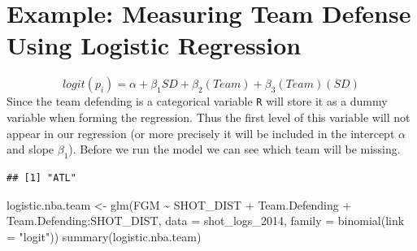\documentclass[
]{book}
\newenvironment{Shaded}{\begin{snugshade}}{\end{snugshade}}
\newcommand{\AttributeTok}[1]{\textcolor[rgb]{0.77,0.63,0.00}{#1}}
\newcommand{\DecValTok}[1]{\textcolor[rgb]{0.00,0.00,0.81}{#1}}
\newcommand{\FunctionTok}[1]{\textcolor[rgb]{0.00,0.00,0.00}{#1}}
\newcommand{\NormalTok}[1]{#1}
\newcommand{\OtherTok}[1]{\textcolor[rgb]{0.56,0.35,0.01}{#1}}
\newcommand{\SpecialCharTok}[1]{\textcolor[rgb]{0.00,0.00,0.00}{#1}}
\newcommand{\StringTok}[1]{\textcolor[rgb]{0.31,0.60,0.02}{#1}}
\theoremstyle{definition}
\theoremstyle{definition}
\theoremstyle{definition}
\theoremstyle{definition}
\theoremstyle{remark}
\begin{document}
\hypertarget{example-measuring-team-defense-using-logistic-regression}{%
\section{Example: Measuring Team Defense Using Logistic Regression}\label{example-measuring-team-defense-using-logistic-regression}}

\[
logit(p_i)=\alpha+\beta_1 SD+\beta_2 (Team)+\beta_3 (Team) (SD)
\]
Since the team defending is a categorical variable \texttt{R} will store it as a dummy variable when forming the regression. Thus the first level of this variable will not appear in our regression (or more precisely it will be included in the intercept \(\alpha\) and slope \(\beta_1\)). Before we run the model we can see which team will be missing.

\begin{Shaded}
\end{Shaded}

\begin{verbatim}
## [1] "ATL"
\end{verbatim}

\begin{Shaded}
\begin{Highlighting}[]
\NormalTok{logistic.nba.team }\OtherTok{\textless{}{-}} \FunctionTok{glm}\NormalTok{(FGM }\SpecialCharTok{\textasciitilde{}}\NormalTok{ SHOT\_DIST }\SpecialCharTok{+}\NormalTok{ Team.Defending }\SpecialCharTok{+}\NormalTok{ Team.Defending}\SpecialCharTok{:}\NormalTok{SHOT\_DIST,}
    \AttributeTok{data =}\NormalTok{ shot\_logs\_2014, }\AttributeTok{family =} \FunctionTok{binomial}\NormalTok{(}\AttributeTok{link =} \StringTok{"logit"}\NormalTok{))}
\FunctionTok{summary}\NormalTok{(logistic.nba.team)}
\end{Highlighting}
\end{Shaded}
\end{document}
